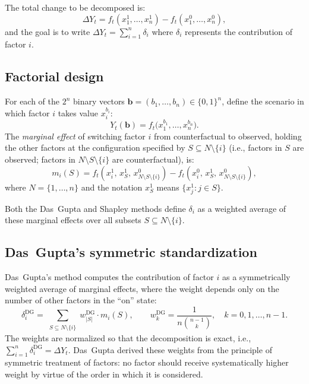 \documentclass[11pt]{article}
\begin{document}
The total change to be decomposed is:
\begin{equation}
\label{eq:total-change}
  \Delta Y_t = f_t(x_1^1, \ldots, x_n^1)
             - f_t(x_1^0, \ldots, x_n^0),
\end{equation}
and the goal is to write $\Delta Y_t = \sum_{i=1}^{n} \delta_i$ where
$\delta_i$ represents the contribution of factor $i$.

\subsection{Factorial design}

For each of the $2^n$ binary vectors
$\mathbf{b} = (b_1, \ldots, b_n) \in \{0, 1\}^n$, define the scenario
in which factor $i$ takes value $x_i^{b_i}$:
\[
  Y_t(\mathbf{b}) = f_t\!\bigl(x_1^{b_1}, \ldots, x_n^{b_n}\bigr).
\]
The \emph{marginal effect} of switching factor $i$ from counterfactual
to observed, holding the other factors at the configuration specified by
$S \subseteq N \setminus \{i\}$ (i.e., factors in $S$ are observed;
factors in $N \setminus S \setminus \{i\}$ are counterfactual), is:
\begin{equation}
\label{eq:marginal}
  m_i(S)
  = f_t(x_i^1, \, x_S^1, \, x_{N \setminus S \setminus \{i\}}^0)
  - f_t(x_i^0, \, x_S^1, \, x_{N \setminus S \setminus \{i\}}^0),
\end{equation}
where $N = \{1, \ldots, n\}$ and the notation $x_S^1$ means
$\{x_j^1 : j \in S\}$.

Both the Das~Gupta and Shapley methods define $\delta_i$ as a weighted
average of these marginal effects over all subsets
$S \subseteq N \setminus \{i\}$.


\subsection{Das~Gupta's symmetric standardization}
\label{sec:dasgupta}

Das~Gupta's method \citep{dasgupta1993standardization} computes the
contribution of factor $i$ as a symmetrically weighted average of
marginal effects, where the weight depends only on the number of other
factors in the ``on'' state:
\begin{equation}
\label{eq:dasgupta}
  \delta_i^{\text{DG}}
  = \sum_{\substack{S \subseteq N \setminus \{i\}}}
    w_{|S|}^{\text{DG}} \cdot m_i(S),
  \qquad
  w_k^{\text{DG}} = \frac{1}{n \binom{n-1}{k}},
  \quad k = 0, 1, \ldots, n-1.
\end{equation}
The weights are normalized so that the decomposition is exact, i.e.,
$\sum_{i=1}^n \delta_i^{\text{DG}} = \Delta Y_t$.
Das~Gupta derived these weights from the principle of symmetric
treatment of factors: no factor should receive systematically higher
weight by virtue of the order in which it is considered.
\end{document}

